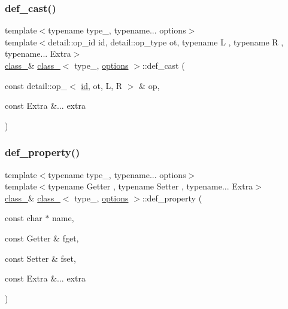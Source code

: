 \mbox{\label{classclass___a4cab61de13f33263eb6a31dd91dfdeb9}} 
\subsubsection{\texorpdfstring{def\_cast()}{def\_cast()}}
{\footnotesize\ttfamily template$<$typename type\+\_\+, typename... options$>$ \\
template$<$detail\+::op\+\_\+id id, detail\+::op\+\_\+type ot, typename L , typename R , typename... Extra$>$ \\
\mbox{\hyperlink{classclass__}{class\+\_\+}}\& \mbox{\hyperlink{classclass__}{class\+\_\+}}$<$ type\+\_\+, \mbox{\hyperlink{classoptions}{options}} $>$\+::def\+\_\+cast (\begin{DoxyParamCaption}\item[{const detail\+::op\+\_\+$<$ \mbox{\hyperlink{_s_d_l__opengl__glext_8h_a58c2a664503e14ffb8f21012aabff3e9}{id}}, ot, L, R $>$ \&}]{op,  }\item[{const Extra \&...}]{extra }\end{DoxyParamCaption})\hspace{0.3cm}{\ttfamily [inline]}}

\mbox{\label{classclass___a2f2cd90a7ae2f7895e0b0caadac82f6f}} 
\subsubsection{\texorpdfstring{def\_property()}{def\_property()}\hspace{0.1cm}{\footnotesize\ttfamily [1/3]}}
{\footnotesize\ttfamily template$<$typename type\+\_\+, typename... options$>$ \\
template$<$typename Getter , typename Setter , typename... Extra$>$ \\
\mbox{\hyperlink{classclass__}{class\+\_\+}}\& \mbox{\hyperlink{classclass__}{class\+\_\+}}$<$ type\+\_\+, \mbox{\hyperlink{classoptions}{options}} $>$\+::def\+\_\+property (\begin{DoxyParamCaption}\item[{const char $\ast$}]{name,  }\item[{const Getter \&}]{fget,  }\item[{const Setter \&}]{fset,  }\item[{const Extra \&...}]{extra }\end{DoxyParamCaption})\hspace{0.3cm}{\ttfamily [inline]}}



